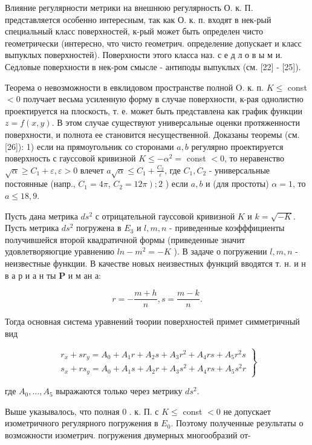 \documentclass[10pt]{article}
\begin{document}
Влияние регулярности метрики на внешнюю регулярность О. к. П. представляется особенно интересным, так как О. к. п. входят в нек-рый специальный класс поверхностей, к-рый может быть определен чисто геометрически (интересно, что чисто геометрич. определение допускает и класс выпуклых поверхностей). Поверхности этого класса наз. с е д л о в ы м и. Седловые поверхности в нек-ром смысле - антиподы выпуклых (см. [22] - [25]).



Теорема о невозможности в евклидовом пространстве полной O. к. п. $K \leqslant$ const $<0$ получает весьма усиленную форму в случае поверхности, к-рая однолистно проектируется на плоскость, т. е. может быть представлена как график функции $z=f(x, y)$. В этом случае существуют универсальные оценки протяженности поверхности, и полнота ее становится несущественной. Доказаны теоремы (см. [26]): 1) если на прямоугольник со сторонами $a, b$ регулярно проектируется поверхность с гауссовой кривизной $K \leqslant-\alpha^{2}=$ const $<0$, то неравенство $\sqrt{\alpha} \geqslant C_{1}+\varepsilon, \varepsilon>0$ влечет $a \sqrt{\alpha} \leqslant C_{1}+\frac{C_{2}}{\varepsilon}$, где $C_{1}, C_{2}$ - универсальные постоянные (напр., $C_{1}=4 \pi$, $\left.C_{2}=12 \pi\right) ; 2$ ) если $a, b$ и (для простоты) $\alpha=1$, то $a \leqslant 18,9$.



Пусть дана метрика $d s^{2}$ с отрицательной гауссовой кривизной $K$ и $k=\sqrt{-K}$. Пусть метрика $d s^{2}$ погружена в $E_{3}$ и $l, m, n$ - приведенные коэфффициенты получившейся второй квадратичной формы (приведенные значит удовлетворяюгцие уравнению $l n-m^{2}=-K$ ). В задаче о погружении $l, m, n$ - неизвестные функции. В качестве новых неизвестных функций вводятся т. н. и н в а р и а н ты $\mathbf{P}$ и м ан а:



\[

r=-\frac{m+h}{n}, s=\frac{m-k}{n} .

\]



Тогда основная система уравнений төории поверхностей примет симметричный вид



\[

\left.\begin{array}{l}

r_{x}+s r_{y}=A_{0}+A_{1} r+A_{2} s+A_{3} r^{2}+A_{4} r s+A_{5} r^{2} s \\

s_{x}+r s_{y}=A_{0}+A_{1} s+A_{2} r+A_{3} s^{2}+A_{4} r s+A_{5} s^{2} r

\end{array}\right\}

\]



где $A_{0}, \ldots, A_{5}$ выражаются только через метрику $d s^{2}$.



Выше указывалось, что полная 0 . к. П. с $K \leqslant$ const $<0$ не допускает изометричного регулярного погружения в $E_{0}$. Поэтому полученные результаты о возможности изометрич. погружения двумерных многообразий от-
\end{document}

